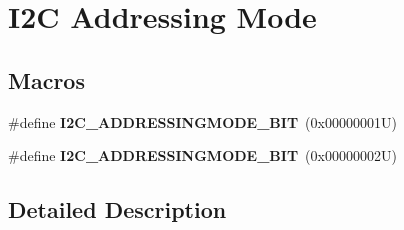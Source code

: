 \hypertarget{group___i2_c___a_d_d_r_e_s_s_i_n_g___m_o_d_e}{}\section{I2C Addressing Mode}
\label{group___i2_c___a_d_d_r_e_s_s_i_n_g___m_o_d_e}
\subsection*{Macros}
\begin{DoxyCompactItemize}
\item 
\mbox{\label{group___i2_c___a_d_d_r_e_s_s_i_n_g___m_o_d_e_ga28cf3b277595ac15edf383c2574ed18d}} 
\#define {\bfseries I2\+C\+\_\+\+A\+D\+D\+R\+E\+S\+S\+I\+N\+G\+M\+O\+D\+E\+\_\+B\+IT}~(0x00000001\+U)
\item 
\mbox{\label{group___i2_c___a_d_d_r_e_s_s_i_n_g___m_o_d_e_ga2401dc32e64cd53290497bab73c3608d}} 
\#define {\bfseries I2\+C\+\_\+\+A\+D\+D\+R\+E\+S\+S\+I\+N\+G\+M\+O\+D\+E\+\_\+B\+IT}~(0x00000002\+U)
\end{DoxyCompactItemize}


\subsection{Detailed Description}
